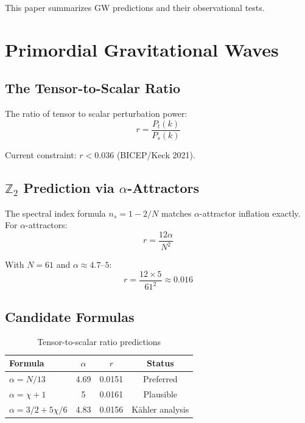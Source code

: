 \documentclass[12pt,a4paper]{article}
\begin{document}
This paper summarizes GW predictions and their observational tests.

\section{Primordial Gravitational Waves}

\subsection{The Tensor-to-Scalar Ratio}

The ratio of tensor to scalar perturbation power:
\begin{equation}
r = \frac{P_t(k)}{P_s(k)}
\end{equation}

Current constraint: $r < 0.036$ (BICEP/Keck 2021).

\subsection{$\mathbb{Z}_2$ Prediction via $\alpha$-Attractors}

The spectral index formula $n_s = 1 - 2/N$ matches $\alpha$-attractor inflation exactly. For $\alpha$-attractors:
\begin{equation}
r = \frac{12\alpha}{N^2}
\end{equation}

With $N = 61$ and $\alpha \approx 4.7$--$5$:
\begin{equation}
r = \frac{12 \times 5}{61^2} \approx 0.016
\end{equation}

\subsection{Candidate Formulas}

\begin{table}[h]
\centering
\begin{tabular}{lccc}
\toprule
Formula & $\alpha$ & $r$ & Status \\
\midrule
$\alpha = N/13$ & 4.69 & 0.0151 & Preferred \\
$\alpha = \chi + 1$ & 5 & 0.0161 & Plausible \\
$\alpha = 3/2 + 5\chi/6$ & 4.83 & 0.0156 & K\"ahler analysis \\
\bottomrule
\end{tabular}
\caption{Tensor-to-scalar ratio predictions}
\end{table}
\end{document}
